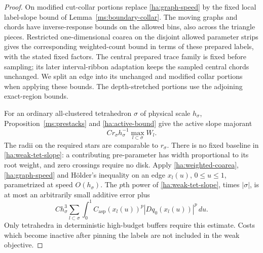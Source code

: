 \begin{proof}
On modified cut-collar portions replace \eqref{ha:graph-speed} by
the fixed local label-slope bound of
Lemma~\ref{ms:boundary-collar}.  The moving graphs and chords have
inverse-response bounds on the allowed bins, also across the
triangle pieces.  Restricted one-dimensional coarea on the disjoint
allowed parameter strips gives the corresponding weighted-count
bound in terms of these prepared labels, with the stated fixed
factors.  The central prepared trace family is fixed before sampling;
its later interval-ribbon adaptation keeps the sampled central
chords unchanged.  We split an edge into its unchanged and modified
collar portions when applying these bounds.  The depth-stretched
portions use the adjoining exact-region bounds.

For an ordinary all-clustered tetrahedron $\sigma$ of physical scale
$h_\sigma$, Proposition~\ref{ms:prestacks} and
\eqref{ha:active-bound} give the active slope majorant
\begin{equation}\label{ha:weak-tet-slope}
                 C r_\sigma h_\sigma^{-1}
                     \max_{l\subset\sigma}W_l.
\end{equation}
The radii on the required stars are comparable to $r_\sigma$.
There is no fixed baseline in \eqref{ha:weak-tet-slope}: a
contributing pre-parameter has width proportional to its root
weight, and zero crossings require no disk.  Apply
\eqref{ha:weighted-coarea}, \eqref{ha:graph-speed} and H\"older's
inequality on an edge $x_l(u)$, $0\le u\le1$, parametrized at speed
$O(h_\sigma)$.  The $p$th power of
\eqref{ha:weak-tet-slope}, times $|\sigma|$, is at most an arbitrarily
small additive error plus
\begin{equation}\label{ha:edge-power}
 C h_\sigma^3\sum_{l\subset\sigma}
       \int_0^1 C_{\mathrm{asp}}(x_l(u))^p
                    |Dq_0(x_l(u))|^p\,du.
\end{equation}
Only tetrahedra in deterministic high-budget buffers require this
estimate.  Costs which become inactive after pinning the labels are
not included in the weak objective.


\end{proof}
